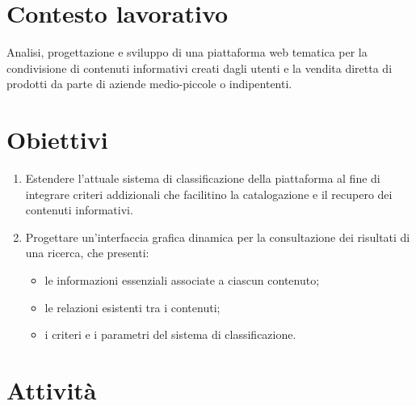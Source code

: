 \documentclass[10pt,a4paper,hidelinks]{scrartcl} %
\begin{document}
    \title{\rmfamily\normalfont{}}
    \author{}
    \date{\today}
    
    \maketitle
    
    \begin{abstract}
        \noindent Piano di lavoro settimanale per stage esterno presso \textsf{FondaMente}.
    \end{abstract}
    
	\tableofcontents

    \section{Contesto lavorativo}
	Analisi, progettazione e sviluppo di una piattaforma web tematica per la condivisione di contenuti informativi creati dagli utenti e la vendita diretta di prodotti da parte di aziende medio-piccole o indipententi.

	\section{Obiettivi}
	\begin{enumerate}
		\item Estendere l'attuale sistema di classificazione della piattaforma al fine di integrare criteri addizionali che facilitino la catalogazione e il recupero dei contenuti informativi.
		\item Progettare un'interfaccia grafica dinamica per la consultazione dei risultati di una ricerca, che presenti:
		\begin{itemize}
			\item le informazioni essenziali associate a ciascun contenuto;
			\item le relazioni esistenti tra i contenuti;
			\item i criteri e i parametri del sistema di classificazione.
		\end{itemize}
	\end{enumerate}

	\section{Attivit\`a}
	
\end{document}
